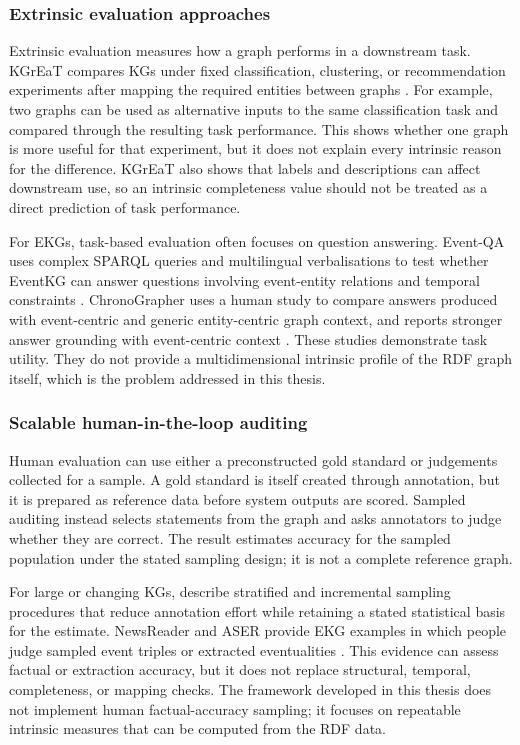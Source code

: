 \subsubsection{Extrinsic evaluation approaches}

Extrinsic evaluation measures how a graph performs in a downstream task. KGrEaT compares KGs under fixed classification, clustering, or recommendation experiments after mapping the required entities between graphs \citep{kgreat2023}. For example, two graphs can be used as alternative inputs to the same classification task and compared through the resulting task performance. This shows whether one graph is more useful for that experiment, but it does not explain every intrinsic reason for the difference. KGrEaT also shows that labels and descriptions can affect downstream use, so an intrinsic completeness value should not be treated as a direct prediction of task performance.

For EKGs, task-based evaluation often focuses on question answering. Event-QA uses complex SPARQL queries and multilingual verbalisations to test whether EventKG can answer questions involving event-entity relations and temporal constraints \citep{eventqa2020}. ChronoGrapher uses a human study to compare answers produced with event-centric and generic entity-centric graph context, and reports stronger answer grounding with event-centric context \citep{chronographer2023}. These studies demonstrate task utility. They do not provide a multidimensional intrinsic profile of the RDF graph itself, which is the problem addressed in this thesis.

\subsubsection{Scalable human-in-the-loop auditing}

Human evaluation can use either a preconstructed gold standard or judgements collected for a sample. A gold standard is itself created through annotation, but it is prepared as reference data before system outputs are scored. Sampled auditing instead selects statements from the graph and asks annotators to judge whether they are correct. The result estimates accuracy for the sampled population under the stated sampling design; it is not a complete reference graph.

For large or changing KGs, \citet{efficienteval2019} describe stratified and incremental sampling procedures that reduce annotation effort while retaining a stated statistical basis for the estimate. NewsReader and ASER provide EKG examples in which people judge sampled event triples or extracted eventualities \citep{newsreader2016,aser2019}. This evidence can assess factual or extraction accuracy, but it does not replace structural, temporal, completeness, or mapping checks. The framework developed in this thesis does not implement human factual-accuracy sampling; it focuses on repeatable intrinsic measures that can be computed from the RDF data.

